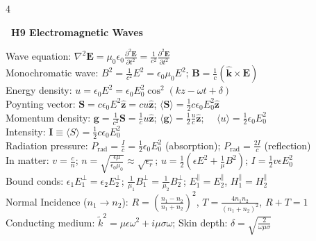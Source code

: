 \documentclass[a4paper,twoside]{article}
\newcommand{\secblock}[1]{%
\par\vspace{1.5pt}%
\noindent\colorbox{hdrcol}{\parbox[c][0.95em][c]{0.99\linewidth}{\color{white}\bfseries\scriptsize \ #1}}\par
\vspace{0.8pt}%
}
\begin{document}
\begin{multicols*}{4}
\secblock{H9 Electromagnetic Waves}
Wave equation: $\nabla^2 \bm E = \mu_0\epsilon_0 \frac{\partial^2 \bm E}{\partial t^2} = \frac{1}{c^2}\frac{\partial^2 \bm E}{\partial t^2}$ \\
Monochromatic wave: \(B^2 = \frac{1}{c^2} E^2 = \epsilon_0 \mu_0 E^2\); \quad $\bm B = \frac{1}{c}(\hat{\bm k}\times \bm E)$ \\
Energy density: \(u = \epsilon_0 E^2 = \epsilon_0 E_0^2 \cos^2(k z - \omega t + \delta)\) \\
Poynting vector: \(\bm S = c \epsilon_0 E^2 \hat{\bm z} = c u \hat{\bm z}\); \quad \(\langle \bm S \rangle = \frac{1}{2} c \epsilon_0 E_0^2 \hat{\bm z}\) \\
Momentum density: \(\bm g = \frac{1}{c^2} \bm S = \frac{1}{c} u \hat{\bm z}\); \quad \(\langle \bm g \rangle = \frac{1}{2} \frac{u}{c} \hat{\bm z}\); \(\quad \langle u \rangle = \frac{1}{2} \epsilon_0 E_0^2 \)\\
Intensity: \(\bm I \equiv \langle S \rangle = \frac{1}{2} c \epsilon_0 E_0^2\) \\
Radiation pressure: \(P_{\text{rad}} = \frac{I}{c} = \frac{1}{2}\epsilon_0 E_0^2\) (absorption); $P_{\text{rad}} = \frac{2I}{c}$ (reflection) \\
In matter: \(v = \frac{c}{n}\); \quad \(n = \sqrt{\frac{\epsilon \mu}{\epsilon_0 \mu_0}} \approx \sqrt{\epsilon_r}\); \quad \(u = \frac{1}{2} (\epsilon E^2 + \frac{1}{\mu} B^2)\); \quad \(I = \frac{1}{2} v \epsilon E_0^2\) \\
Bound conds: \(\epsilon_1 E_1^{\perp} = \epsilon_2 E_2^{\perp}\); \quad \(\frac{1}{\mu_1} B_1^{\perp} = \frac{1}{\mu_2} B_2^{\perp}\); \quad $E_1^{\parallel}=E_2^{\parallel}$, $H_1^{\parallel}=H_2^{\parallel}$ \\
Normal Incidence ($n_1 \to n_2$): $R = \left(\frac{n_1-n_2}{n_1+n_2}\right)^2$, $T = \frac{4n_1 n_2}{(n_1+n_2)^2}$, $R+T=1$ \\
Conducting medium: $\tilde{k}^2 = \mu\epsilon\omega^2 + i\mu\sigma\omega$; \quad Skin depth: $\delta = \sqrt{\frac{2}{\omega\mu\sigma}}$


\end{multicols*}
\end{document}
